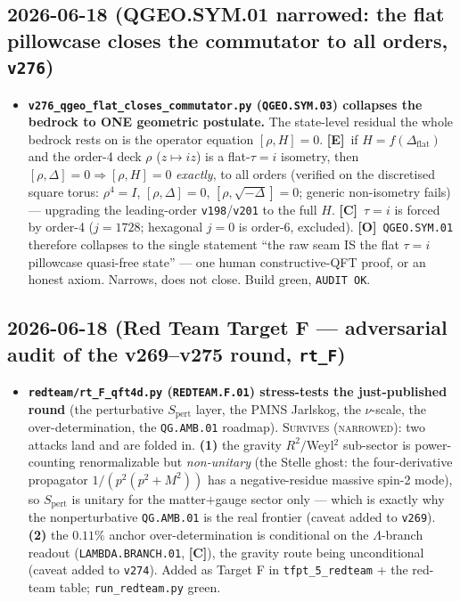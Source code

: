 \documentclass[11pt]{article}
\providecommand{\mE}{\textbf{[E]}}\providecommand{\mC}{\textbf{[C]}}
\providecommand{\mO}{\textbf{[O]}}\providecommand{\mX}{\textbf{[X]}}
\providecommand{\vref}[1]{\texttt{#1}}
\begin{document}
\subsection*{2026-06-18 (QGEO.SYM.01 narrowed: the flat pillowcase closes the commutator to all orders, \texttt{v276})}
\begin{itemize}
\item \textbf{\texttt{v276\_qgeo\_flat\_closes\_commutator.py} (\texttt{QGEO.SYM.03}) collapses the bedrock
  to ONE geometric postulate.} The state-level residual the whole bedrock rests on is the operator equation
  $[\rho,H]{=}0$. \mE\ if $H=f(\Delta_{\mathrm{flat}})$ and the order-4 deck $\rho$ ($z{\mapsto}iz$) is a
  flat-$\tau{=}i$ isometry, then $[\rho,\Delta]{=}0\Rightarrow[\rho,H]{=}0$ \emph{exactly}, to all orders
  (verified on the discretised square torus: $\rho^4{=}I$, $[\rho,\Delta]{=}0$, $[\rho,\sqrt{-\Delta}]{=}0$;
  generic non-isometry fails) --- upgrading the leading-order \vref{v198}/\vref{v201} to the full $H$. \mC\
  $\tau{=}i$ is forced by order-4 ($j{=}1728$; hexagonal $j{=}0$ is order-6, excluded). \mO\ \texttt{QGEO.SYM.01}
  therefore collapses to the single statement ``the raw seam IS the flat $\tau{=}i$ pillowcase quasi-free
  state'' --- one human constructive-QFT proof, or an honest axiom. Narrows, does not close. Build green,
  \texttt{AUDIT OK}.
\end{itemize}

\subsection*{2026-06-18 (Red Team Target F --- adversarial audit of the v269--v275 round, \texttt{rt\_F})}
\begin{itemize}
\item \textbf{\texttt{redteam/rt\_F\_qft4d.py} (\texttt{REDTEAM.F.01}) stress-tests the just-published round}
  (the perturbative $S_{\mathrm{pert}}$ layer, the PMNS Jarlskog, the $\nu$-scale, the over-determination,
  the \texttt{QG.AMB.01} roadmap). \textsc{Survives (narrowed)}: two attacks land and are folded in.
  \textbf{(1)} the gravity $R^2/$Weyl$^2$ sub-sector is power-counting renormalizable but \emph{non-unitary}
  (the Stelle ghost: the four-derivative propagator $1/(p^2(p^2+M^2))$ has a negative-residue massive spin-2
  mode), so $S_{\mathrm{pert}}$ is unitary for the matter$+$gauge sector only --- which is exactly why the
  nonperturbative \texttt{QG.AMB.01} is the real frontier (caveat added to \vref{v269}). \textbf{(2)} the
  $0.11\%$ anchor over-determination is conditional on the $\Lambda$-branch readout (\texttt{LAMBDA.BRANCH.01},
  \mC), the gravity route being unconditional (caveat added to \vref{v274}). Added as Target F in
  \texttt{tfpt\_5\_redteam} + the red-team table; \texttt{run\_redteam.py} green.
\end{itemize}
\end{document}

